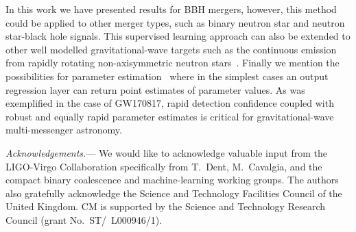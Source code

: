 \documentclass[%
showpacs,
 amsmath,amssymb,
 aps,
 twocolumn,
 prl,
 reprint,
floatfix,
]{revtex4-1}
\begin{document}
%
%
In this work we have presented results for \ac{BBH} mergers, however, this
method could be applied to other merger types, such as binary neutron star and
neutron star-black hole signals. This supervised learning approach can also be
extended to other well modelled gravitational-wave targets such as the
continuous emission from rapidly rotating non-axisymmetric neutron
stars~\cite{1707.02669}. %
Finally we mention the possibilities for parameter
estimation~\cite{1701.00008} where in the simplest cases an output regression
layer can return point estimates of parameter values. As was exemplified in the
case of GW170817, rapid detection confidence coupled with robust and equally
rapid parameter estimates is critical for gravitational-wave multi-messenger
astronomy. 

%
%
\emph{Acknowledgements.}---
%
We would like to acknowledge valuable input from the LIGO-Virgo Collaboration
specifically from T.~Dent, M.~Cavalgia, and the compact binary coalescence and
machine-learning working groups. The authors also gratefully acknowledge the
Science and Technology Facilities Council of the United Kingdom. CM is
supported by the Science and Technology Research Council (grant
No.~ST/~L000946/1).
%




\end{document}

